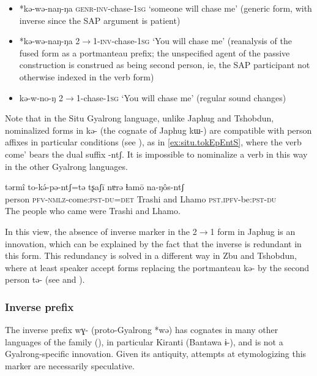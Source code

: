 \documentclass[oldfontcommands,oneside,a4paper,11pt]{article}
\newcommand{\ipa}[1]{\mbox{\phon #1}} %
\begin{document}
\begin{itemize}
\item *\ipa{kə-wə-naŋ-ŋa}  \textsc{genr}-\textsc{inv}-chase-\textsc{1sg} `someone will chase me' (generic form, with inverse since the SAP argument is patient)
\item  *\ipa{kə-wə-naŋ-ŋa}  2$\rightarrow$1-\textsc{inv}-chase-\textsc{1sg} `You will chase me' (reanalysis of the fused form as a portmanteau prefix; the unspecified agent of the passive construction is construed as being second person, ie, the SAP participant not otherwise indexed in the verb form)
\item  \ipa{kə-w-no-ŋ} 2$\rightarrow$1-chase-\textsc{1sg} `You will chase me'  (regular sound changes)
\end{itemize}

Note that in the Situ Gyalrong language, unlike Japhug and Tshobdun, nominalized forms in \ipa{kə-} (the cognate of Japhug \ipa{kɯ-}) are compatible with person affixes in particular conditions (see \citealt[11-12]{jacksonlin07}), as in \ref{ex:situ.tokEpEntS}, where the verb  come' bears the dual suffix \ipa{-ntʃ}. It is impossible to nominalize a verb in this way in the other Gyalrong languages.

 \begin{exe}
\ex \label{ex:situ.tokEpEntS}
\gll
\ipa{tərmî}  	\ipa{to-kə́-pə-ntʃ=tə}  	\ipa{tʂaʃī}  	\ipa{nɐrə}  	\ipa{ɬamō}  	\ipa{na-ŋôs-ntʃ}  	\\
person \textsc{pfv-nmlz}-come:\textsc{pst}-\textsc{du=det} Trashi and Lhamo \textsc{pst.ipfv}-be:\textsc{pst}-\textsc{du} \\
\glt The people who came were Trashi and Lhamo.
  \end{exe}

In this view, the absence of inverse marker in the  2$\rightarrow$1 form in Japhug is an innovation, which can be explained by the fact that the inverse is redundant in this form. This redundancy is solved in a different way in Zbu and Tshobdun, where at least speaker accept forms replacing the portmanteau \ipa{kə-} by the second person \ipa{tə-} (see \citealt{jackson02rentongdengdi} and \citealt{gongxun14agreement}).



 \subsubsection{Inverse prefix}
The inverse prefix \ipa{wɣ-} (proto-Gyalrong *\ipa{wə}) has cognates in many other languages of the family (\citealt{jacques12agreement}), in particular Kiranti (Bantawa \ipa{ɨ-}), and is not a Gyalrong-specific innovation. Given its antiquity, attempts at etymologizing this marker are necessarily speculative. 
\end{document}
